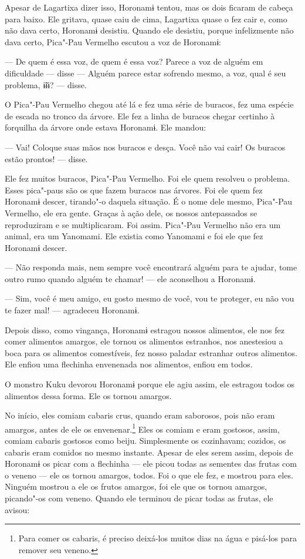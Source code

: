 Apesar de Lagartixa dizer isso, Horonamɨ tentou, mas os dois ficaram de
cabeça para baixo. Ele gritava, quase caiu de cima, Lagartixa quase o
fez cair e, como não dava certo, Horonamɨ desistiu. Quando ele desistiu,
porque infelizmente não dava certo, Pica"-Pau Vermelho escutou a voz de
Horonamɨ: 

--- De quem é essa voz, de quem é essa voz? Parece a voz de alguém em
dificuldade --- disse --- Alguém parece estar sofrendo mesmo, a voz,
qual é seu problema, ɨ̃ɨɨ? --- disse. 

O Pica"-Pau Vermelho chegou até lá e fez uma série de buracos, fez uma
espécie de escada no tronco da árvore. Ele fez a linha de buracos chegar
certinho à forquilha da árvore onde estava Horonamɨ. Ele mandou: 

--- Vai! Coloque suas mãos nos buracos e desça. Você não vai cair! Os
buracos estão prontos! --- disse. 

Ele fez muitos buracos, Pica"-Pau Vermelho. Foi ele quem resolveu o
problema. Esses pica"-paus são os que fazem buracos nas árvores. Foi ele
quem fez Horonamɨ descer, tirando"-o daquela situação. É o nome dele
mesmo, Pica"-Pau Vermelho, ele era gente. Graças à
ação dele, os nossos antepassados se reproduziram e se multiplicaram.
Foi assim. Pica"-Pau Vermelho não era um animal, era um Yanomami. Ele
existia como Yanomami e foi ele que fez Horonamɨ descer. 

--- Não responda mais, nem sempre você encontrará alguém para te
ajudar, tome outro rumo quando alguém te chamar! --- ele aconselhou a
Horonamɨ. 

--- Sim, você é meu amigo, eu gosto mesmo de você, vou te proteger, eu
não vou te fazer mal! --- agradeceu Horonamɨ. 

Depois disso, como vingança, Horonamɨ estragou nossos alimentos, ele nos
fez comer alimentos amargos, ele tornou os alimentos estranhos, nos
anestesiou a boca para os alimentos comestíveis, fez nosso paladar
estranhar outros alimentos. Ele enfiou uma flechinha envenenada nos
alimentos, enfiou em todos. 

O monstro Kuku devorou Horonamɨ porque ele agiu assim, ele
estragou todos os alimentos dessa forma. Ele os tornou amargos. 

No início, eles comiam cabaris crus, quando eram saborosos, pois não
eram amargos, antes de ele os envenenar.\footnote{  Para comer os cabaris, é preciso deixá-los muitos dias na água e pisá-los para remover seu veneno.} Eles os comiam e eram gostosos, assim, comiam cabaris gostosos como beiju. Simplesmente os cozinhavam;
cozidos, os cabaris eram comidos no mesmo instante. Apesar de eles serem
assim, depois de Horonamɨ os picar com a flechinha --- ele picou todas
as sementes das frutas com o veneno --- ele os tornou amargos, todos.
Foi o que ele fez, e mostrou para eles. Ninguém mostrou a ele os frutos
amargos, foi ele que os tornou amargos, picando"-os com veneno. Quando
ele terminou de picar todas as frutas, ele avisou: 

